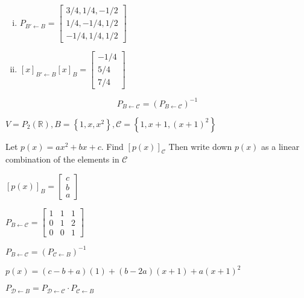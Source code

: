 \begin{sol}
	\begin{enumerate}[i)]
		\item $P_{B' \leftarrow B} = \begin{bmatrix}
			3/4,1/4,-1/2\\1/4,-1/4,1/2\\-1/4,1/4,1/2
		\end{bmatrix}$
		
		\item $[x]_{B' \leftarrow B} [x]_B = \begin{bmatrix}
			-1/4\\5/4\\7/4
		\end{bmatrix}$
	\end{enumerate}
\end{sol}

\begin{theorem}
	\begin{equation} \label{eq:cob-inv}
		P_{B \leftarrow \mathcal{C}} = \left(P_{B \leftarrow \mathcal{C}}\right)^{-1}
	\end{equation}
\end{theorem}

\begin{example}
	$V = P_2(\mathbb{R}), B = \left\{1,x,x^2\right\}, \mathcal{C} = \left\{1, x+1, (x+1)^2\right\}$

	Let $p(x) = ax^2 + bx + c$. Find $[p(x)]_\mathcal{C}$ Then write down $p(x)$ as a linear combination of the elements in $\mathcal{C}$
\end{example}

\begin{sol}
	$[p(x)]_B = \begin{bmatrix}
		c\\b\\a
	\end{bmatrix}$

	$P_{B \leftarrow \mathcal{C}} = \begin{bmatrix}
		1 & 1 & 1\\
		0 & 1 & 2\\
		0 & 0 & 1
	\end{bmatrix}$

	$P_{B \leftarrow \mathcal{C}} = \left(P_{\mathcal{C} \leftarrow B}\right)^{-1}$

	$p(x) = (c-b+a)(1) + (b-2a)(x+1) + a(x+1)^2$
\end{sol}

\begin{theorem}
	$P_{\mathcal{D} \leftarrow B} = P_{\mathcal{D} \leftarrow \mathcal{C}} \cdot P_{\mathcal{C} \leftarrow B}$
\end{theorem}